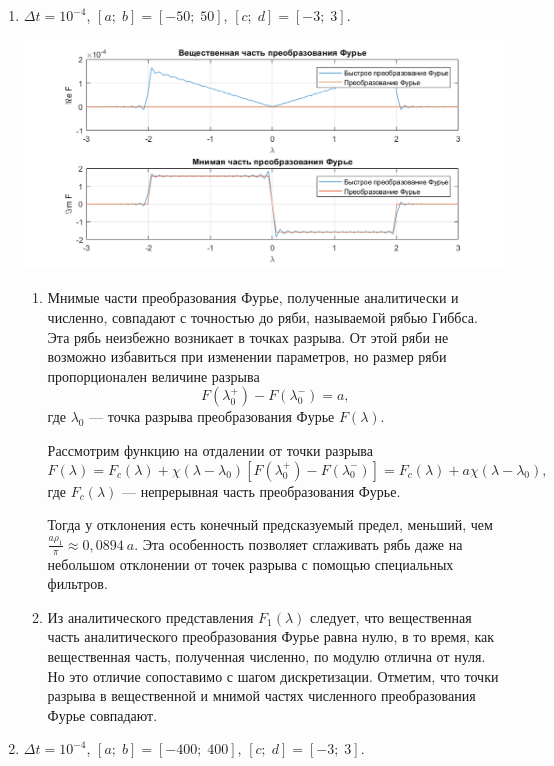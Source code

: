 \documentclass[a4paper, 11pt]{article}
\begin{document}
    \begin{enumerate}
        \item
            $\Delta t = 10^{-4}$, $[a;\; b] = [-50;\; 50]$, $[c;\;d] = [-3;\;3]$.
            
            \includegraphics[width=\linewidth]{img/1.png}
            
            \begin{enumerate}
                \item
                    Мнимые части преобразования Фурье, полученные аналитически и численно, совпадают с точностью до ряби, называемой рябью Гиббса. Эта рябь неизбежно возникает в точках разрыва. От этой ряби не возможно избавиться при изменении параметров, но размер ряби пропорционален величине разрыва
			        $$
			        	F(\lambda_0^+) - F(\lambda_0^-) = a,
			        $$
где $\lambda_0$ --- точка разрыва преобразования Фурье $F(\lambda)$.

		            Рассмотрим функцию на отдалении от точки разрыва
                    $$
                        F(\lambda) = F_c(\lambda) + \chi(\lambda - \lambda_0)\left[ F(\lambda_0^+) - F(\lambda_0^-)\right] = F_c(\lambda) + a \chi (\lambda - \lambda_0),
                    $$
                    где $F_c(\lambda)$ --- непрерывная часть преобразования Фурье.

                    Тогда у отклонения есть конечный предсказуемый предел, меньший, чем $\frac{a\rho_1}{\pi} \approx 0,0894\:a$. Эта особенность позволяет сглаживать рябь даже на небольшом отклонении от точек разрыва с помощью специальных фильтров.
                \item
                     Из аналитического представления $F_1(\lambda)$ следует, что вещественная часть аналитического преобразования Фурье равна нулю, в то время, как вещественная часть, полученная численно, по модулю отлична от нуля. Но это отличие сопоставимо с шагом дискретизации. Отметим, что точки разрыва в вещественной и мнимой частях численного преобразования Фурье совпадают. 
            \end{enumerate}
        \item
              $\Delta t = 10^{-4}$, $[a;\; b] = [-400;\; 400]$, $[c;\;d] = [-3;\;3]$.             
              

\end{enumerate}
\end{document}
